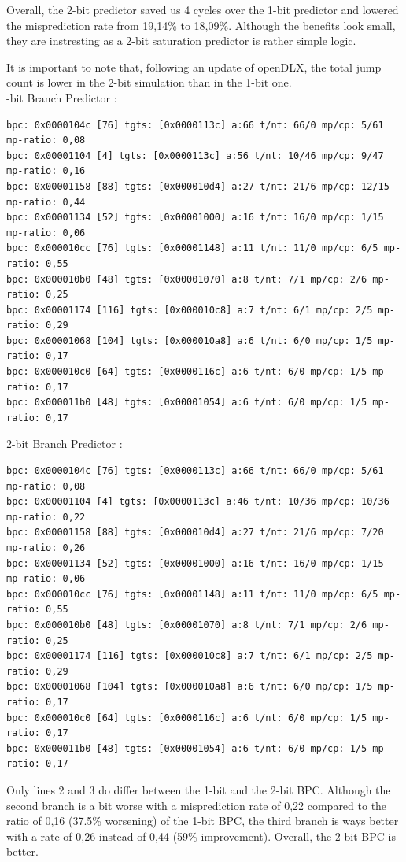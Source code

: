 \documentclass[a4paper]{report}
\begin{document}
Overall, the 2-bit predictor saved us 4 cycles over the 1-bit predictor and lowered the misprediction rate
from 19,14\% to 18,09\%. Although the benefits look small, they are instresting as a 2-bit saturation
predictor is rather simple logic.

It is important to note that, following an update of openDLX, the total jump count is lower in the 2-bit
simulation than in the 1-bit one.
\mbox{}\\

-bit Branch Predictor :
\begin{verbatim}
bpc: 0x0000104c [76] tgts: [0x0000113c] a:66 t/nt: 66/0 mp/cp: 5/61 mp-ratio: 0,08
bpc: 0x00001104 [4] tgts: [0x0000113c] a:56 t/nt: 10/46 mp/cp: 9/47 mp-ratio: 0,16
bpc: 0x00001158 [88] tgts: [0x000010d4] a:27 t/nt: 21/6 mp/cp: 12/15 mp-ratio: 0,44
bpc: 0x00001134 [52] tgts: [0x00001000] a:16 t/nt: 16/0 mp/cp: 1/15 mp-ratio: 0,06
bpc: 0x000010cc [76] tgts: [0x00001148] a:11 t/nt: 11/0 mp/cp: 6/5 mp-ratio: 0,55
bpc: 0x000010b0 [48] tgts: [0x00001070] a:8 t/nt: 7/1 mp/cp: 2/6 mp-ratio: 0,25
bpc: 0x00001174 [116] tgts: [0x000010c8] a:7 t/nt: 6/1 mp/cp: 2/5 mp-ratio: 0,29
bpc: 0x00001068 [104] tgts: [0x000010a8] a:6 t/nt: 6/0 mp/cp: 1/5 mp-ratio: 0,17
bpc: 0x000010c0 [64] tgts: [0x0000116c] a:6 t/nt: 6/0 mp/cp: 1/5 mp-ratio: 0,17
bpc: 0x000011b0 [48] tgts: [0x00001054] a:6 t/nt: 6/0 mp/cp: 1/5 mp-ratio: 0,17
\end{verbatim}
2-bit Branch Predictor :
\begin{verbatim}
bpc: 0x0000104c [76] tgts: [0x0000113c] a:66 t/nt: 66/0 mp/cp: 5/61 mp-ratio: 0,08
bpc: 0x00001104 [4] tgts: [0x0000113c] a:46 t/nt: 10/36 mp/cp: 10/36 mp-ratio: 0,22
bpc: 0x00001158 [88] tgts: [0x000010d4] a:27 t/nt: 21/6 mp/cp: 7/20 mp-ratio: 0,26
bpc: 0x00001134 [52] tgts: [0x00001000] a:16 t/nt: 16/0 mp/cp: 1/15 mp-ratio: 0,06
bpc: 0x000010cc [76] tgts: [0x00001148] a:11 t/nt: 11/0 mp/cp: 6/5 mp-ratio: 0,55
bpc: 0x000010b0 [48] tgts: [0x00001070] a:8 t/nt: 7/1 mp/cp: 2/6 mp-ratio: 0,25
bpc: 0x00001174 [116] tgts: [0x000010c8] a:7 t/nt: 6/1 mp/cp: 2/5 mp-ratio: 0,29
bpc: 0x00001068 [104] tgts: [0x000010a8] a:6 t/nt: 6/0 mp/cp: 1/5 mp-ratio: 0,17
bpc: 0x000010c0 [64] tgts: [0x0000116c] a:6 t/nt: 6/0 mp/cp: 1/5 mp-ratio: 0,17
bpc: 0x000011b0 [48] tgts: [0x00001054] a:6 t/nt: 6/0 mp/cp: 1/5 mp-ratio: 0,17
\end{verbatim}

Only lines 2 and 3 do differ between the 1-bit and the 2-bit BPC. Although the second branch is a bit worse
with a misprediction rate of 0,22 compared to the ratio of 0,16 (37.5\% worsening) of the 1-bit BPC, the third
branch is ways better with a rate of 0,26 instead of 0,44 (59\% improvement). Overall, the 2-bit BPC is
better.
\mbox{}\\
\end{document}
